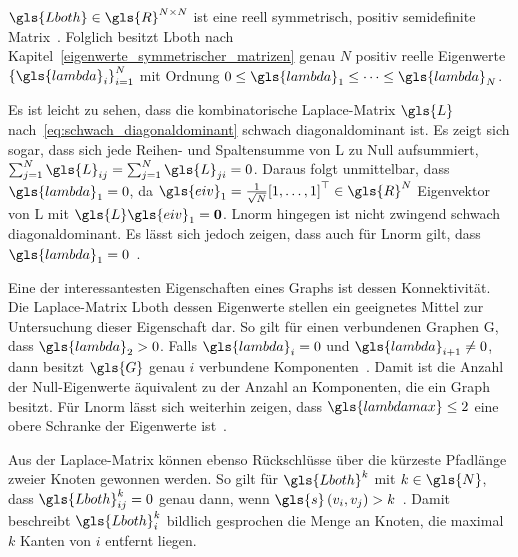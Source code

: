 $\gls{Lboth} \in \gls{R}^{N \times N}$ ist eine reell symmetrisch, positiv semidefinite Matrix~\cite{Chung}.
Folglich besitzt \gls{Lboth} nach Kapitel~\ref{eigenwerte_symmetrischer_matrizen} genau $N$ positiv reelle Eigenwerte ${\left\{\gls{lambda}_i\right\}}_{i=1}^N$ mit Ordnung $0 \leq \gls{lambda}_1 \leq \cdots \leq \gls{lambda}_N$.

Es ist leicht zu sehen, dass die kombinatorische Laplace-Matrix $\gls{L}$ nach~\eqref{eq:schwach_diagonaldominant} schwach diagonaldominant ist.
Es zeigt sich sogar, dass sich jede Reihen- und Spaltensumme von \gls{L} zu Null aufsummiert, \dhe{} $\sum_{j=1}^N \gls{L}_{ij} = \sum_{j=1}^N \gls{L}_{ji} = 0$.
Daraus folgt unmittelbar, dass $\gls{lambda}_1 = 0$, da $\gls{eiv}_1 = \frac{1}{\sqrt{N}}{\left[1, \ldots, 1\right]}^{\top} \in \gls{R}^N$ Eigenvektor von \gls{L} mit $\gls{L}\gls{eiv}_1 = \ve{0}$.
\gls{Lnorm} hingegen ist nicht zwingend schwach diagonaldominant.
Es lässt sich jedoch zeigen, dass auch für \gls{Lnorm} gilt, dass $\gls{lambda}_1 = 0$~\cite{Chung}.

Eine der interessantesten Eigenschaften eines Graphs ist dessen Konnektivität.
Die Laplace-Matrix \gls{Lboth} \bzw{} dessen Eigenwerte stellen ein geeignetes Mittel zur Untersuchung dieser Eigenschaft dar.
So gilt \zB{} für einen verbundenen Graphen \gls{G}, dass $\gls{lambda}_2 > 0$.
Falls $\gls{lambda}_i = 0$ und $\gls{lambda}_{i+1} \neq 0$, dann besitzt $\gls{G}$ genau $i$ verbundene Komponenten~\cite{Chung}.
Damit ist die Anzahl der Null-Eigenwerte äquivalent zu der Anzahl an Komponenten, die ein Graph besitzt.
Für \gls{Lnorm} lässt sich weiterhin zeigen, dass $\gls{lambdamax} \leq 2$ eine obere Schranke der Eigenwerte ist~\cite{Chung}.

Aus der Laplace-Matrix können ebenso Rückschlüsse über die kürzeste Pfadlänge zweier Knoten gewonnen werden.
So gilt für $\gls{Lboth}^{k}$ mit $k \in \gls{N}$, dass $\gls{Lboth}^k_{ij} = 0$ genau dann, wenn $\gls{s}\left(v_i, v_j\right) > k$~\cite{Hammond}.
Damit beschreibt $\gls{Lboth}^k_i$ bildlich gesprochen die Menge an Knoten, die maximal $k$ Kanten von $i$ entfernt liegen.
